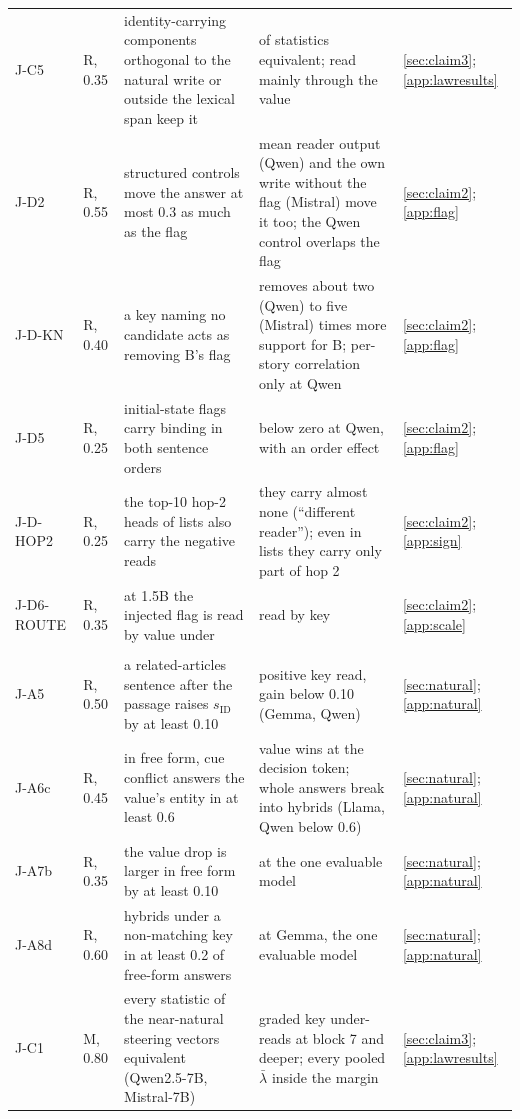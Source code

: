 \begin{table}[p]
\begin{tabular}{@{}p{}p{}p{}p{}p{}@{}}
J-C5 & R, 0.35 & identity-carrying components orthogonal to the natural write or outside the lexical span keep it & \JcFiveNeq{} of \JcFiveNstat{} statistics equivalent; read mainly through the value & \cref{sec:claim3}; \cref{app:lawresults} \\
J-D2 & R, 0.55 & structured controls move the answer at most 0.3 as much as the flag & mean reader output (Qwen) and the own write without the flag (Mistral) move it too; the Qwen control overlaps the flag & \cref{sec:claim2}; \cref{app:flag} \\
J-D-KN & R, 0.40 & a key naming no candidate acts as removing B's flag & removes about two (Qwen) to five (Mistral) times more support for B; per-story correlation only at Qwen & \cref{sec:claim2}; \cref{app:flag} \\
J-D5 & R, 0.25 & initial-state flags carry binding in both sentence orders & below zero at Qwen, with an order effect & \cref{sec:claim2}; \cref{app:flag} \\
J-D-HOP2 & R, 0.25 & the top-10 hop-2 heads of lists also carry the negative reads & they carry almost none (``different reader''); even in lists they carry only part of hop 2 & \cref{sec:claim2}; \cref{app:sign} \\
J-D6-ROUTE & R, 0.35 & at 1.5B the injected flag is read by value under \fmtPost{} & read by key & \cref{sec:claim2}; \cref{app:scale} \\
\addlinespace[2pt]
\multicolumn{5}{@{}l}{\textit{Direction kept, threshold missed}} \\
J-A5 & R, 0.50 & a related-articles sentence after the passage raises $s_{\mathrm{ID}}$ by at least 0.10 & positive key read, gain below 0.10 (Gemma, Qwen) & \cref{sec:natural}; \cref{app:natural} \\
J-A6c & R, 0.45 & in free form, cue conflict answers the value's entity in at least 0.6 & value wins at the decision token; whole answers break into hybrids (Llama, Qwen below 0.6) & \cref{sec:natural}; \cref{app:natural} \\
J-A7b & R, 0.35 & the value drop is larger in free form by at least 0.10 & \JaSevenbDiffQwenSeven{} at the one evaluable model & \cref{sec:natural}; \cref{app:natural} \\
J-A8d & R, 0.60 & hybrids under a non-matching key in at least 0.2 of free-form answers & \JaEightdNomGemmaNine{} at Gemma, the one evaluable model & \cref{sec:natural}; \cref{app:natural} \\
J-C1 & M, 0.80 & every statistic of the near-natural steering vectors equivalent (Qwen2.5-7B, Mistral-7B) & graded key under-reads at block 7 and deeper; every pooled $\bar\lambda$ inside the margin & \cref{sec:claim3}; \cref{app:lawresults} \\

\end{tabular}
\end{table}
